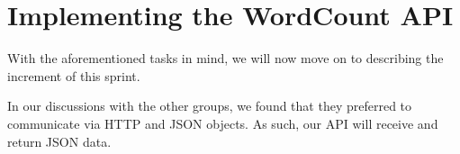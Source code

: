 \section{Implementing the WordCount API}
With the aforementioned tasks in mind, we will now move on to describing the increment of this sprint.

In our discussions with the other groups, we found that they preferred to communicate via HTTP and JSON objects. As such, our API will receive and return JSON data.






